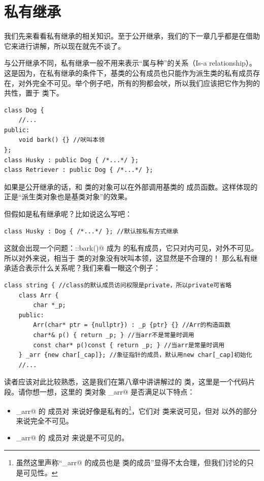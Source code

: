 \section{私有继承}
我们先来看看私有继承的相关知识。至于公开继承，我们的下一章几乎都是在借助它来进行讲解，所以现在就先不谈了。\par
与公开继承不同，私有继承一般不用来表示``属与种''的关系（Is-a relationship）。这是因为，在私有继承的条件下，基类的公有成员也只能作为派生类的私有成员存在，对外完全不可见。举个例子吧，所有的狗都会吠，所以我们应该把它作为狗的共性，置于 \lstinline@Dog@ 类下。
\begin{lstlisting}
class Dog {
    //...
public:
    void bark() {} //吠叫本领
};
class Husky : public Dog { /*...*/ };
class Retriever : public Dog { /*...*/ };
\end{lstlisting}
如果是公开继承的话，\lstinline@Husky@ 和 \lstinline@Dog@ 类的对象可以在外部调用基类的 \lstinline@bark@ 成员函数。这样体现的正是``派生类对象也是基类对象''的效果。\par
但假如是私有继承呢？比如说这么写吧：
\begin{lstlisting}
class Husky : Dog { /*...*/ }; //默认按私有方式继承
\end{lstlisting}
这就会出现一个问题：\lstinline@Dog::bark()@ 成为 \lstinline@Husky@ 的私有成员，它只对内可见，对外不可见。所以对外来说，相当于 \lstinline@Husky@ 类的对象没有吠叫本领，这显然是不合理的！
那么私有继承适合表示什么关系呢？我们来看一眼这个例子：
\begin{lstlisting}
class string { //class的默认成员访问权限是private，所以private可省略
    class Arr {
        char *_p;
    public:
        Arr(char* ptr = {nullptr}) : _p {ptr} {} //Arr的构造函数
        char*& p() { return _p; } //当arr不是常量时调用
        const char* p()const { return _p; } //当arr是常量时调用
    } _arr {new char[_cap]}; //象征指针的成员，默认用new char[_cap]初始化
    //...
\end{lstlisting}
读者应该对此比较熟悉，这是我们在第八章中讲讲解过的 \lstinline@string@ 类，这里是一个代码片段。请你想一想，这里的 \lstinline@Arr@ 类对象 \lstinline@_arr@ 是否满足以下特点：
\begin{itemize}
    \item \lstinline@_arr@ 的 \lstinline@public@ 成员对 \lstinline@string@ 来说好像是私有的\footnote{虽然这里声称``\lstinline@_arr@ 的成员也是 \lstinline@string@ 类的成员''显得不太合理，但我们讨论的只是可见性。}，它们对 \lstinline@string@ 类来说可见，但对 \lstinline@string@ 以外的部分来说完全不可见。
    \item \lstinline@_arr@ 的 \lstinline@private@ 成员对 \lstinline@string@ 来说是不可见的。
\end{itemize}
